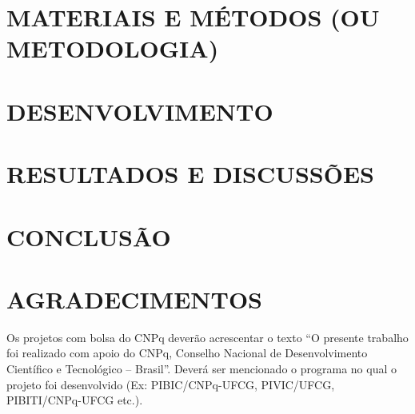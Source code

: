 \documentclass[
	article,			%
	12pt,				%
	oneside,			%
	a4paper,			%
	section=TITLE,		%
	subsection=TITLE,	%
	english,			%
	brazil,				%
	sumario=tradicional
	]{abntex2}
\begin{document}
\lipsum[7]

\section*{MATERIAIS E MÉTODOS (OU METODOLOGIA)}

\lipsum[3]

\section*{DESENVOLVIMENTO}

\lipsum[4]

\section*{RESULTADOS E DISCUSSÕES}

\lipsum[5]

\section*{CONCLUSÃO}

\lipsum[6]

\section*{AGRADECIMENTOS}

Os projetos com bolsa do CNPq deverão acrescentar o texto “O presente trabalho foi realizado com apoio do CNPq, Conselho Nacional de Desenvolvimento Científico e Tecnológico – Brasil”. Deverá ser mencionado o programa no qual o projeto foi desenvolvido (Ex: PIBIC/CNPq-UFCG, PIVIC/UFCG, PIBITI/CNPq-UFCG etc.).


\newpage


\end{document}
